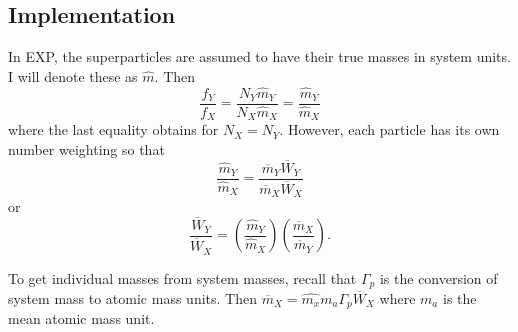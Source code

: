 \documentclass[12pt]{article}
\begin{document}
\subsection{Implementation}

In EXP, the superparticles are assumed to have their true masses in
system units.  I will denote these as $\hat{m}$.  Then
\begin{equation}
  \frac{f_Y}{f_X} = \frac{N_Y {\hat m}_{Y}}{N_X \hat{m}_{X}} = \frac{{\hat m}_{Y}}{\hat{m}_{X}}
\end{equation}
where the last equality obtains for $N_X=N_Y$.  However, each particle
has its own number weighting so that
\begin{equation}
\frac{{\hat m}_{Y}}{\hat{m}_{X}} = \frac{\overline{m}_{Y} \overline{W}_{Y}}{\overline{m}_{X} \overline{W}_{X}}
\end{equation}
or
\begin{equation}
\frac{\overline{W}_{Y}}{\overline{W}_{X}} = 
\left(\frac{{\hat m}_{Y}}{\hat{m}_{X}}\right)
\left(\frac{\overline{m}_{X}}{\overline{m}_{Y}}\right).
\end{equation}

To get individual masses from system masses, recall that $\Gamma_p$ is
the conversion of system mass to atomic mass units.  Then $\overline{m}_X =
\hat{m_x}m_a\Gamma_p \overline{W}_X$ where $m_a$ is the mean atomic mass unit.


\label{sec:ref}
\end{document}
